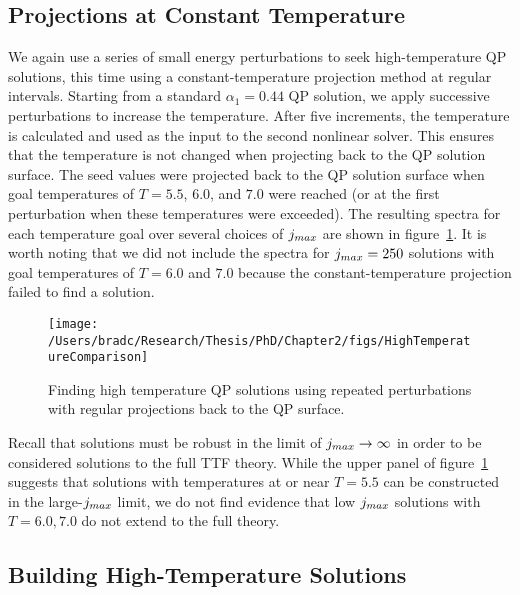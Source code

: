 \documentclass[../PhD.tex]{subfiles}
\begin{document}

\subsection{Projections at Constant Temperature}
\label{ssec: T projections}

We again use a series of small energy perturbations to seek high-temperature QP solutions, this time using a constant-temperature projection method at regular intervals. Starting from a standard $\alpha_1 = 0.44$ QP solution, we apply successive perturbations to increase the temperature. After five increments, the temperature is calculated and used as the input to the second nonlinear solver. This ensures that the temperature is not changed when projecting back to the QP solution surface. The seed values were projected back to the QP solution surface when goal temperatures of $T=5.5$, $6.0$, and $7.0$ were reached (or at the first perturbation when these temperatures were exceeded). The resulting spectra for each temperature goal over several choices of $j_{max}$ are shown in figure~\ref{fig: const T perturbs}. It is worth noting that we did not include the spectra for $j_{max} = 250$ solutions with goal temperatures of $T=6.0$ and $7.0$ because the constant-temperature projection failed to find a solution.

\begin{figure}[tp!]
	\centering
		\texttt{[image: /Users/bradc/Research/Thesis/PhD/Chapter2/figs/HighTemperatureComparison]}
		\caption{Finding high temperature QP solutions using repeated perturbations with regular projections back to the QP surface.}
		\label{fig: const T perturbs}
\end{figure}

Recall that solutions must be robust in the limit of $j_{max} \to \infty$ in order to be considered solutions to the full TTF theory. While the upper panel of figure~\ref{fig: const T perturbs} suggests that solutions with temperatures at or near $T=5.5$ can be constructed in the large-$j_{max}$ limit, we do not find evidence that low $j_{max}$ solutions with $T=6.0, 7.0$ do not extend to the full theory.


\subsection{Building High-Temperature Solutions}
\label{ssec: by hand highT}
\end{document}
